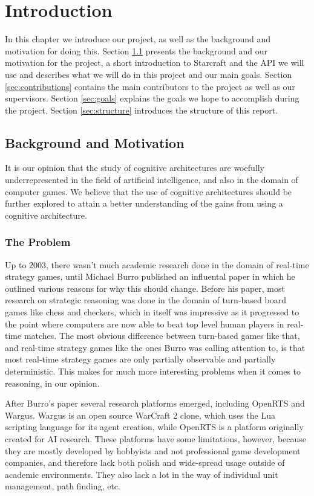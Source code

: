 
\chapter{Introduction}
In this chapter we introduce our project, as well as the background and motivation for doing this. Section \ref{sec:background} presents the background and our motivation for the project, a short introduction to Starcraft and the API we will use and describes what we will do in this project and our main goals. Section \ref{sec:contributions} contains the main contributors to the project as well as our supervisors. Section \ref{sec:goals} explains the goals we hope to accomplish during the project. Section \ref{sec:structure} introduces the structure of this report.

\section{Background and Motivation}
\label{sec:background}
It is our opinion that the study of cognitive architectures are woefully underrepresented in the field of artificial intelligence, and also in the domain of computer games. We believe that the use of cognitive architectures should be further explored to attain a better understanding of the gains from using a cognitive architecture.

\subsection{The Problem}
Up to 2003, there wasn't much academic research done in the domain of real-time strategy games, until Michael Burro published an influental paper in which he outlined various reasons for why this should change.\cite{buro2003real} Before his paper, most research on strategic reasoning was done in the domain of turn-based board games like chess and checkers, which in itself was impressive as it progressed to the point where computers are now able to beat top level human players in real-time matches.\cite{campbell2002deep} The most obvious difference between turn-based games like that, and real-time strategy games like the ones Burro was calling attention to, is that most real-time strategy games are only partially observable and partially deterministic. This makes for much more interesting problems when it comes to reasoning, in our opinion.

After Burro's paper several research platforms emerged, including OpenRTS\cite{buro2003orts} and Wargus\cite{wargus}. Wargus is an open source WarCraft 2 clone, which uses the Lua scripting language for its agent creation, while OpenRTS is a platform originally created for AI research. These platforms have some limitations, however, because they are mostly developed by hobbyists and not professional game development companies, and therefore lack both polish and wide-spread usage outside of academic environments. They also lack a lot in the way of individual unit management, path finding, etc.

